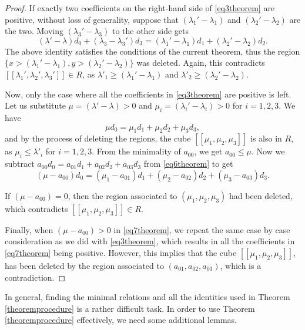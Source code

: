 \documentclass[12pt]{article}
\theoremstyle{remark}
\begin{document}
\begin{proof}
If exactly two coefficients on the right-hand side of \eqref{eq3theorem} are positive, without loss of generality, suppose that $(\lambda_1' - \lambda_1)$ and $(\lambda_2' - \lambda_2)$ are the two. Moving $(\lambda_3' - \lambda_3)$ to the other side gets
    \begin{equation}\label{eq5theorem}
        (\lambda' - \lambda)d_0  + (\lambda_3 - \lambda_3')d_3= (\lambda_1' - \lambda_1)d_1  + (\lambda_2' - \lambda_2)d_2.
    \end{equation}
The above identity satisfies the conditions of the current theorem, thus the region $\{x > (\lambda_1' - \lambda_1), y > (\lambda_2' - \lambda_2)\}$ was deleted. Again, this contradicts $[[\lambda_1',\lambda_2',\lambda_3']] \in R$, as $\lambda'_1 \geq (\lambda_1' - \lambda_1)$ and $\lambda'_2 \geq (\lambda_2' - \lambda_2)$.

Now, only the case where all the coefficients in \eqref{eq3theorem} are positive is left. Let us substitute $\mu =(\lambda' - \lambda)  > 0$ and $\mu_i =(\lambda_i' - \lambda_i)  >0$ for $i = 1,2,3$. We have
    \begin{equation}\label{eq6theorem}
         \mu d_0 = \mu_1d_1 + \mu_2d_2 + \mu_3d_3,
    \end{equation}
and by the process of deleting the regions, the cube $[[\mu_1,\mu_2,\mu_3]]$ is also in $R$, as $\mu_i \leq \lambda'_i$ for $i = 1,2,3$. 
From the minimality of $a_{00}$, we get $a_{00} \leq \mu$. Now we subtract $a_{00}d_0 = a_{01}d_1 + a_{02}d_2 + a_{03}d_3$ from \eqref{eq6theorem} to get
\begin{equation}\label{eq7theorem}
    (\mu - a_{00}) d_0 = (\mu_1 - a_{01})d_1 +  (\mu_2 - a_{02})d_2 + (\mu_3 - a_{03})d_3.
\end{equation}
    
If $(\mu - a_{00}) = 0$, then 
the region associated to $(\mu_1,\mu_2,\mu_3)$ had been deleted, which contradicts $[[\mu_1,\mu_2,\mu_3]] \in R$. 

Finally, when $(\mu - a_{00}) > 0$ in \eqref{eq7theorem}, we repeat the same case by case consideration as we did with \eqref{eq3theorem}, which results in all the coefficients in \eqref{eq7theorem} being positive. However, this implies that the cube $[[\mu_1,\mu_2,\mu_3]]$, has been deleted by the region associated to $(a_{01}, a_{02}, a_{03})$, which is a contradiction. 
\end{proof}


In general, finding the minimal relations and all the identities used in Theorem \ref{theoremprocedure} is a rather difficult task. In order to use Theorem \ref{theoremprocedure} effectively, we need some additional lemmas.
\end{document}

